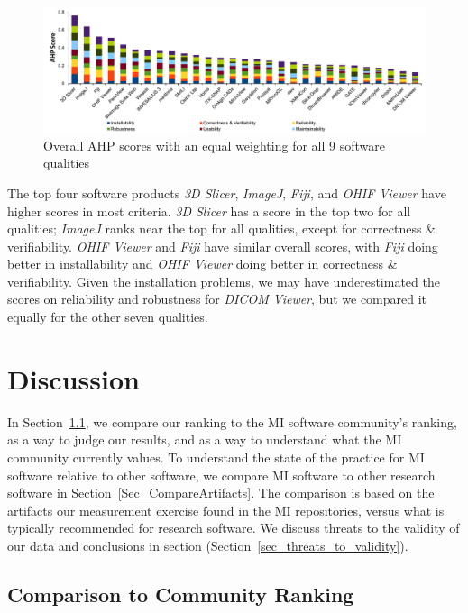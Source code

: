 \documentclass[11pt]{article}
\begin{document}
\begin{figure}[!ht]
\includegraphics[scale=0.47]{overall_scores.pdf}
\caption{Overall AHP scores with an equal weighting for all 9 software qualities}

\label{fg_overall_scores}
\end{figure}

The top four software products \textit{3D Slicer}, \textit{ImageJ},
\textit{Fiji}, and \textit{OHIF Viewer} have higher scores in most criteria.
\textit{3D Slicer} has a score in the top two for all qualities; \textit{ImageJ}
ranks near the top for all qualities, except for correctness \& verifiability.
\textit{OHIF Viewer} and \textit{Fiji} have similar overall scores, with
\textit{Fiji} doing better in installability and \textit{OHIF Viewer} doing
better in correctness \& verifiability.  Given the installation problems, we may
have underestimated the scores on reliability and robustness for \textit{DICOM
Viewer}, but we compared it equally for the other seven qualities.

\section{Discussion}

In Section~\ref{Sec_VsCommunityRanking}, we compare our ranking to the MI
software community's ranking, as a way to judge our results, and as a way to
understand what the MI community currently values. To understand the state of
the practice for MI software relative to other software, we compare MI software
to other research software in Section~\ref{Sec_CompareArtifacts}.  The
comparison is based on the artifacts our measurement exercise found in the MI
repositories, versus what is typically recommended for research software.  We
discuss threats to the validity of our data and conclusions in section
(Section~\ref{sec_threats_to_validity}).

\subsection{Comparison to Community Ranking} \label{Sec_VsCommunityRanking}
\end{document}
